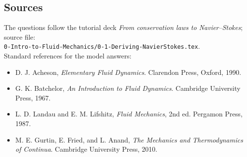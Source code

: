 \documentclass[12pt]{article}
\begin{document}
\subsection*{Sources}
The questions follow the tutorial deck \emph{From conservation laws to Navier--Stokes}; source file:\\
{\small\texttt{0-Intro-to-Fluid-Mechanics/0-1-Deriving-NavierStokes.tex}}.\\
Standard references for the model answers:
\begin{itemize}[itemsep=0.2em]
  \item D. J. Acheson, \emph{Elementary Fluid Dynamics}. Clarendon Press, Oxford, 1990.
  \item G. K. Batchelor, \emph{An Introduction to Fluid Dynamics}. Cambridge University Press, 1967.
  \item L. D. Landau and E. M. Lifshitz, \emph{Fluid Mechanics}, 2nd ed. Pergamon Press, 1987.
  \item M. E. Gurtin, E. Fried, and L. Anand, \emph{The Mechanics and Thermodynamics of Continua}. Cambridge University Press, 2010.
\end{itemize}
\end{document}
